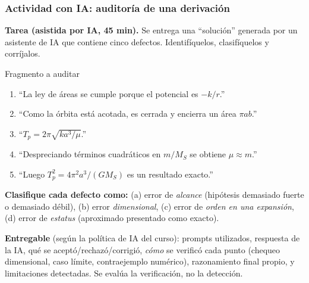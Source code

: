 \documentclass[10pt]{beamer}
\begin{document}
\begin{frame}
\frametitle{Actividad con IA: auditoría de una derivación}
\small
\textbf{Tarea (asistida por IA, 45 min).} Se entrega una ``solución'' generada por
un asistente de IA que contiene \alert{cinco} defectos. Identifíquelos,
clasifíquelos y corríjalos.
\begin{block}{Fragmento a auditar}
\begin{enumerate}\footnotesize
  \item ``La ley de áreas se cumple porque el potencial es $-k/r$.''
  \item ``Como la órbita está acotada, es cerrada y encierra un área $\pi ab$.''
  \item ``$T_p=2\pi\sqrt{k a^{3}/\mu}$.''
  \item ``Despreciando términos cuadráticos en $m/M_S$ se obtiene $\mu\approx m$.''
  \item ``Luego $T_p^{2}=4\pi^{2}a^{3}/(GM_S)$ es un resultado exacto.''
\end{enumerate}
\end{block}
\textbf{Clasifique cada defecto como:} (a) error de \emph{alcance} (hipótesis
demasiado fuerte o demasiado débil), (b) error \emph{dimensional}, (c) error de
\emph{orden en una expansión}, (d) error de \emph{estatus} (aproximado
presentado como exacto).
\medskip

\textbf{Entregable} (según la política de IA del curso): prompts utilizados,
respuesta de la IA, qué se aceptó/rechazó/corrigió, \emph{cómo} se verificó cada
punto (chequeo dimensional, caso límite, contraejemplo numérico), razonamiento
final propio, y limitaciones detectadas. Se evalúa la \alert{verificación}, no la
detección.
\end{frame}
\end{document}
